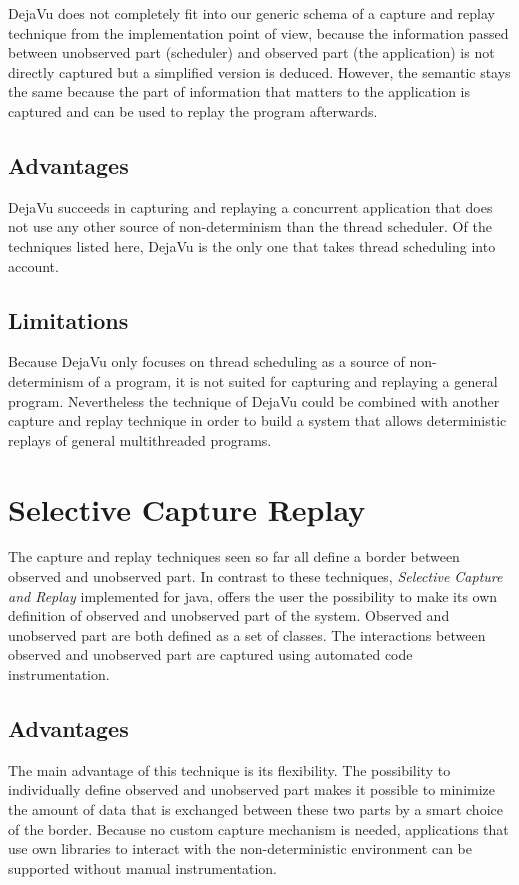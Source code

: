 DejaVu does not completely fit into our generic schema of a capture and replay technique from the implementation point of view, because the information passed between unobserved part (scheduler) and observed part (the application) is not directly captured but a simplified version is deduced. However, the semantic stays the same because the part of information that matters to the application is captured and can be used to replay the program afterwards.

\subsection{Advantages}
DejaVu succeeds in capturing and replaying a concurrent application that does not use any other source of non-determinism than the thread scheduler. Of the techniques listed here, DejaVu is the only one that takes thread scheduling into account.
\subsection{Limitations}
Because DejaVu only focuses on thread scheduling as a source of non-determinism of a program, it is not suited for capturing and replaying a general program. Nevertheless the technique of DejaVu could be combined with another capture and replay technique in order to build a system that allows deterministic replays of general multithreaded programs.

\section{Selective Capture Replay}
The capture and replay techniques seen so far all define a border between observed and unobserved part. In contrast to these techniques, \emph{Selective Capture and Replay} \cite{orso05may} implemented for java, offers the user the possibility to make its own definition of observed and unobserved part of the system. Observed and unobserved part are both defined as a set of classes. The interactions between observed and unobserved part are captured using automated code instrumentation.
\subsection{Advantages}
The main advantage of this technique is its flexibility. The possibility to individually define observed and unobserved part makes it possible to minimize the amount of data that is exchanged between these two parts by a smart choice of the border. Because no custom capture mechanism is needed, applications that use own libraries to interact with the non-deterministic environment can be supported without manual instrumentation. 
